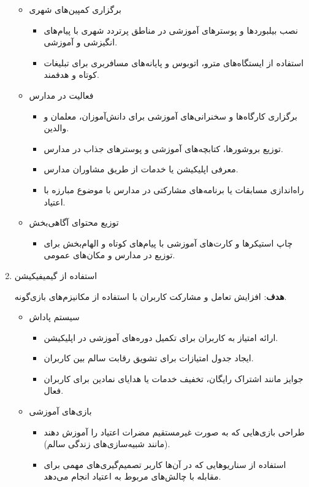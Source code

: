 \documentclass[dvipsnames, svgnames, x11names, 11pt]{article}
\begin{document}
\begin{enumerate}
\begin{itemize}
\item 
برگزاری کمپین‌های شهری
\begin{itemize}
\item 
نصب بیلبوردها و پوسترهای آموزشی در مناطق پرتردد شهری با پیام‌های انگیزشی و آموزشی.  
\item 
استفاده از ایستگاه‌های مترو، اتوبوس و پایانه‌های مسافربری برای تبلیغات کوتاه و هدفمند.  
\end{itemize}
\item 
فعالیت در مدارس
\begin{itemize}
\item 
برگزاری کارگاه‌ها و سخنرانی‌های آموزشی برای دانش‌آموزان، معلمان و والدین.  
\item 
توزیع بروشورها، کتابچه‌های آموزشی و پوسترهای جذاب در مدارس.  
\item 
معرفی اپلیکیشن یا خدمات از طریق مشاوران مدارس.  
\item 
راه‌اندازی مسابقات یا برنامه‌های مشارکتی در مدارس با موضوع مبارزه با اعتیاد.  
\end{itemize}
\item 
توزیع محتوای آگاهی‌بخش
\begin{itemize}
\item 
چاپ استیکرها و کارت‌های آموزشی با پیام‌های کوتاه و الهام‌بخش برای توزیع در مدارس و مکان‌های عمومی.  
\end{itemize}
\end{itemize}

\item 
استفاده از گیمیفیکیشن  
 
\textbf{هدف}:
افزایش تعامل و مشارکت کاربران با استفاده از مکانیزم‌های بازی‌گونه.  
\begin{itemize}
\item 
سیستم پاداش
\begin{itemize}
\item 
ارائه امتیاز به کاربران برای تکمیل دوره‌های آموزشی در اپلیکیشن.  
\item 
ایجاد جدول امتیازات  برای تشویق رقابت سالم بین کاربران.  
\item 
جوایز مانند اشتراک رایگان، تخفیف خدمات یا هدایای نمادین برای کاربران فعال.  
\end{itemize}

\item 
بازی‌های آموزشی
\begin{itemize}
\item 
طراحی بازی‌هایی که به صورت غیرمستقیم مضرات اعتیاد را آموزش دهند (مانند شبیه‌سازی‌های زندگی سالم).  
\item 
استفاده از سناریوهایی که در آن‌ها کاربر تصمیم‌گیری‌های مهمی برای مقابله با چالش‌های مربوط به اعتیاد انجام می‌دهد.  
\end{itemize}


\end{itemize}
\end{enumerate}
\end{document}
